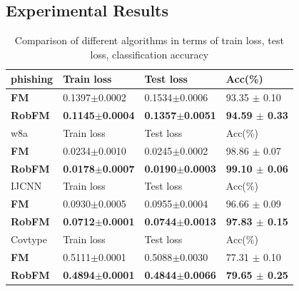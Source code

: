\documentclass[letterpaper]{article} %
\begin{document}
\subsection{Experimental Results}
\begin{table}
	\begin{tabu} to \textwidth {|X[c]| X[c]| X[c]| X[c]|}
		\hline
		phishing           & Train loss & Test loss & Acc(\%)  \\
		\hline
		\textbf{FM} 	  	&0.1397$\pm$0.0002 &0.1534$\pm$0.0006  &93.35 $\pm$ 0.10   \\ \hline
		\textbf{RobFM}   	&\textbf{0.1145$\pm$0.0004} &\textbf{0.1357$\pm$0.0051}  &\textbf{94.59 $\pm$ 0.33}   \\ \hline
		w8a               & Train loss & Test loss & Acc(\%) \\
		\hline
		\textbf{FM} 	 &0.0234$\pm$0.0010  &0.0245$\pm$0.0002  & 98.86 $\pm$ 0.07   \\ \hline
		\textbf{RobFM}   &\textbf{0.0178$\pm$0.0007}  &\textbf{0.0190$\pm$0.0003}  &\textbf{99.10 $\pm$ 0.06}  \\ \hline
		\hline
		IJCNN              & Train loss & Test loss & Acc(\%) \\
		\hline
		\textbf{FM} 	 &0.0930$\pm$0.0005  &0.0955$\pm$0.0004  & 96.66 $\pm$ 0.09 \\ \hline
		\textbf{RobFM} 	 &\textbf{0.0712$\pm$0.0001}  &\textbf{0.0744$\pm$0.0013}  & \textbf{97.83 $\pm$ 0.15}  \\ \hline
		\hline
		Covtype           & Train loss & Test loss & Acc(\%)  \\
		\hline
		\textbf{FM} 	  	&0.5111$\pm$0.0001 &0.5088$\pm$0.0030  &77.31 $\pm$ 0.10   \\ \hline
		\textbf{RobFM}   	&\textbf{0.4894$\pm$0.0001} &\textbf{0.4844$\pm$0.0066}  &\textbf{79.65 $\pm$ 0.25}   \\ \hline
	\end{tabu}
	\caption{Comparison of different algorithms in terms of train loss, test loss, classification accuracy}
\end{table}
\end{document}

